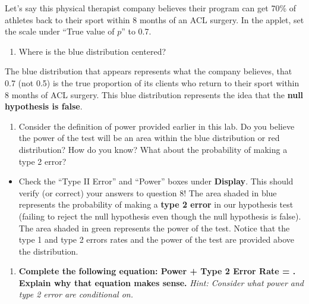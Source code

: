 \documentclass[
]{report}
\providecommand{\tightlist}{%
  \setlength{\itemsep}{0pt}\setlength{\parskip}{0pt}}
\begin{document}
Let's say this physical therapist company believes their program can get 70\% of athletes back to their sport within 8 months of an ACL surgery. In the applet, set the scale under ``True value of \(p\)'' to 0.7.

\begin{enumerate}
\def\labelenumi{\arabic{enumi}.}
\setcounter{enumi}{6}
\tightlist
\item
  Where is the blue distribution centered?
  \vspace{0.25in}
\end{enumerate}

The blue distribution that appears represents what the company believes, that 0.7 (not 0.5) is the true proportion of its clients who return to their sport within 8 months of ACL surgery. This blue distribution represents the idea that the \textbf{null hypothesis is false}.

\begin{enumerate}
\def\labelenumi{\arabic{enumi}.}
\setcounter{enumi}{7}
\tightlist
\item
  Consider the definition of power provided earlier in this lab. Do you believe the power of the test will be an area within the blue distribution or red distribution? How do you know? What about the probability of making a type 2 error?
  \vspace{1in}
\end{enumerate}

\begin{itemize}
\tightlist
\item
  Check the ``Type II Error'' and ``Power'' boxes under \textbf{Display}. This should verify (or correct) your answers to question 8! The area shaded in blue represents the probability of making a \textbf{type 2 error} in our hypothesis test (failing to reject the null hypothesis even though the null hypothesis is false). The area shaded in green represents the power of the test. Notice that the type 1 and type 2 errors rates and the power of the test are provided above the distribution.
\end{itemize}

\begin{enumerate}
\def\labelenumi{\arabic{enumi}.}
\setcounter{enumi}{8}
\tightlist
\item
  \textbf{Complete the following equation: Power + Type 2 Error Rate = . Explain why that equation makes sense.} \emph{Hint: Consider what power and type 2 error are conditional on.}
  \vspace{0.8in}
\end{enumerate}
\end{document}
